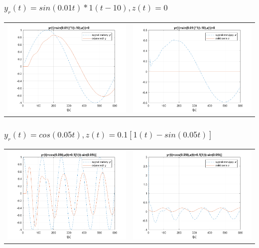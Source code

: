 \documentclass[a4paper]{article}
\begin{document}
\subsubsection{$y_r(t)=sin(0.01t)*1(t-10), z(t)=0$}
\begin{tabular}{cc}
	\includegraphics[width=7cm]{pkt5_3a} &	\includegraphics[width=7cm]{pkt5_3b}
\end{tabular}
\subsubsection{$y_r(t)=cos(0.05t), z(t)=0.1[1(t)-sin(0.05t)]$}
\begin{tabular}{cc}
	\includegraphics[width=7cm]{pkt5_4a} &	\includegraphics[width=7cm]{pkt5_4b}
\end{tabular}
\end{document}
